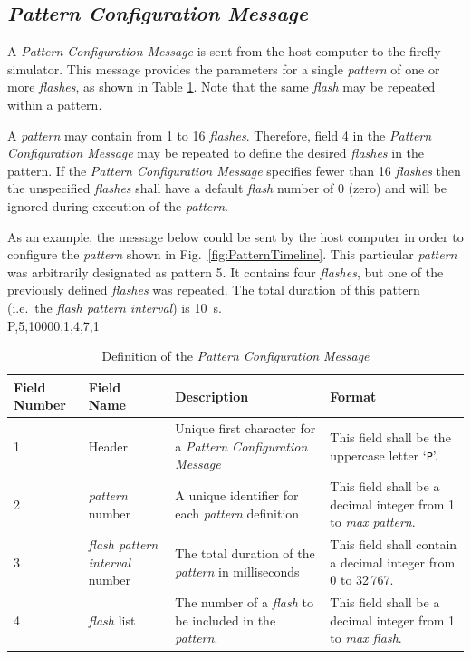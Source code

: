 \documentclass[letterpaper,11pt]{article}
\begin{document}
\subsection{\textit{Pattern Configuration Message}}

A \textit{Pattern Configuration Message} is sent from the host computer to the
firefly simulator. This message provides the parameters for a single
\textit{pattern} of one or more \textit{flashes}, as shown in Table
\ref{tab:PatternConfig}. Note that the same \textit{flash} may be repeated
within a pattern.

A \textit{pattern} may contain from 1 to 16 \textit{flashes}. Therefore, field
4 in the \textit{Pattern Configuration Message} may be repeated to define the
desired \textit{flashes} in the pattern. If the \textit{Pattern Configuration
Message} specifies fewer than 16 \textit{flashes} then the unspecified
\textit{flashes} shall have a default \textit{flash} number of 0 (zero) and
will be ignored during execution of the \textit{pattern}.

As an example, the message below could be sent by the host computer in
order to configure the \textit{pattern} shown in Fig.\
\ref{fig:PatternTimeline}. This particular \textit{pattern} was arbitrarily designated
as pattern 5. It contains four \textit{flashes}, but one of the previously
defined \textit{flashes} was repeated. The total duration of this pattern
(i.e.\ the \textit{flash pattern interval}) is \SI{10}{\second}.\\[12pt]
{\ttfamily
P,5,10000,1,4,7,1\\
}

\begin{table}[H]
\centering
\caption{Definition of the \textit{Pattern Configuration Message}}
\label{tab:PatternConfig}
\setlength\extrarowheight{2pt}
\begin{tabular}[h]{|p{0.5in}|p{1.00in}|p{2.25in}|p{2.25in}|} \hline
Field Number & Field Name & Description & Format \\ \hline
1            & Header
             & Unique first character for a \textit{Pattern Configuration
             Message}
             & This field shall be the uppercase letter `\texttt{P}'.
             \\ \hline
2            & \textit{pattern} number
             & A unique identifier for each \textit{pattern} definition
             & This field shall be a decimal integer from 1 to \textit{max
             pattern}.
             \\ \hline
3            & \textit{flash pattern interval} number
             & The total duration of the \textit{pattern} in milliseconds
             & This field shall contain a decimal integer from 0 to 32\,767.
             \\ \hline
4            & \textit{flash} list
             & The number of a \textit{flash} to be included in the
             \textit{pattern}.
             & This field shall be a decimal integer from 1 to \textit{max
             flash}.
             \\ \hline
\end{tabular}
\end{table}
\end{document}
